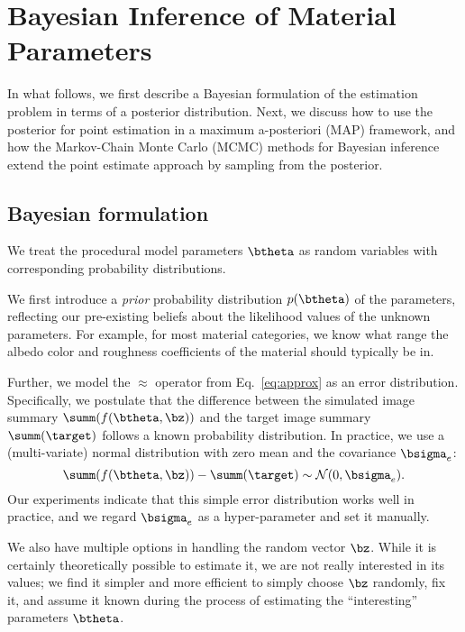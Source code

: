 \section{Bayesian Inference of Material Parameters}
\label{sec:bayesian}
%
In what follows, we first describe a Bayesian formulation of the estimation problem in terms of a posterior distribution. Next, we discuss how to use the posterior for point estimation in a maximum a-posteriori (MAP) framework, and how the Markov-Chain Monte Carlo (MCMC) methods for Bayesian inference extend the point estimate approach by sampling from the posterior.


\subsection{Bayesian formulation}
\label{ssec:point_sec}
%
We treat the procedural model parameters $\btheta$ as random variables with corresponding probability distributions.

We first introduce a \emph{prior} probability distribution $p(\btheta)$ of the parameters, reflecting our pre-existing beliefs about the likelihood values of the unknown parameters. For example, for most material categories, we know what range the albedo color and roughness coefficients of the material should typically be in.

Further, we model the $\approx$ operator from Eq.~\eqref{eq:approx} as an error distribution. Specifically, we postulate that the difference between the simulated image summary $\summ(f(\btheta, \bz))$ and the target %
image summary $\summ(\target)$ follows a known probability distribution.
In practice, we use a (multi-variate) normal distribution with zero mean and the covariance $\bsigma_e$:
%
\begin{equation}
\summ(f(\btheta, \bz)) - \summ(\target) \sim \mathcal{N}(0, \bsigma_e).
\end{equation}
%
Our experiments indicate that this simple error distribution works well in practice, and we regard $\bsigma_e$ as a hyper-parameter and set it manually.

We also have multiple options in handling the random vector $\bz$. While it is certainly theoretically possible to estimate it, we are not really interested in its values;  we find it simpler and more efficient to simply choose $\bz$ randomly, fix it, and assume it known during the process of estimating the ``interesting'' parameters $\btheta$.

